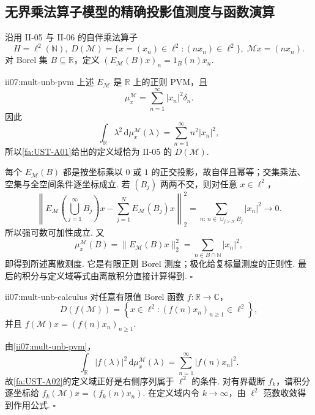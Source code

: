 \subsection{无界乘法算子模型的精确投影值测度与函数演算}

沿用 II-05 与 II-06 的自伴乘法算子
\[
H=\ell^2(\mathbb N),
\;
D(\mathcal M)=\{x=(x_n)\in\ell^2:(nx_n)\in\ell^2\},
\;
\mathcal Mx=(nx_n).
\]
对 Borel 集 \(\displaystyle B\subseteq\mathbb R\)，定义
\(\displaystyle (E_{\mathcal M}(B)x)_n=1_B(n)x_n.\)

\begin{FAProposition}[B][精确谱测度与谱定理定义域]{ii07:mult-unb-pvm}
上述 \(\displaystyle E_{\mathcal M}\) 是 \(\displaystyle\mathbb R\) 上的正则 PVM，且
\[
\mu_x^{\mathcal M}
=
\sum_{n=1}^{\infty}|x_n|^2\delta_n.
\]
因此
\[
\int_{\mathbb R}\lambda^2\,\mathrm{d}\mu_x^{\mathcal M}(\lambda)
=
\sum_{n=1}^{\infty}n^2|x_n|^2,
\]
所以\autoref{fa:UST-A01}给出的定义域恰为 II-05 的 \(\displaystyle D(\mathcal M)\).
\end{FAProposition}

\begin{FAProof}
每个 \(\displaystyle E_{\mathcal M}(B)\) 都是按坐标乘以 \(\displaystyle0\) 或 \(\displaystyle1\) 的正交投影，故自伴且幂等；交集乘法、空集与全空间条件逐坐标成立. 若 \(\displaystyle(B_j)\) 两两不交，则对任意 \(\displaystyle x\in\ell^2\)，
\[
\left\|
E_{\mathcal M}\left(\bigcup_{j=1}^{\infty}B_j\right)x
-
\sum_{j=1}^{N}E_{\mathcal M}(B_j)x
\right\|_2^2
=
\sum_{n:\,n\in\cup_{j>N}B_j}|x_n|^2
\to0.
\]
所以强可数可加性成立. 又
\[
\mu_x^{\mathcal M}(B)
=
\|E_{\mathcal M}(B)x\|_2^2
=
\sum_{n\in B\cap\mathbb N}|x_n|^2,
\]
即得到所述离散测度. 它是有限正则 Borel 测度；极化给复标量测度的正则性. 最后的积分与定义域等式由离散积分直接计算得到.
\hfill\(\square\)
\end{FAProof}

\begin{FAProposition}[B][可测函数演算]{ii07:mult-unb-calculus}
对任意有限值 Borel 函数 \(\displaystyle f:\mathbb R\to\mathbb C\)，
\[
D(f(\mathcal M))
=
\left\{
 x\in\ell^2:
 (f(n)x_n)_{n\geqslant1}\in\ell^2
\right\},
\]
并且
\(\displaystyle f(\mathcal M)x=(f(n)x_n)_{n\geqslant1}.\)
\end{FAProposition}

\begin{FAProof}
由\autoref{ii07:mult-unb-pvm}，
\[
\int_{\mathbb R}|f(\lambda)|^2\,\mathrm{d}\mu_x^{\mathcal M}(\lambda)
=
\sum_{n=1}^{\infty}|f(n)x_n|^2.
\]
故\autoref{fa:UST-A02}的定义域正好是右侧序列属于 \(\displaystyle\ell^2\) 的条件. 对有界截断 \(\displaystyle f_k\)，谱积分逐坐标给 \(\displaystyle f_k(\mathcal M)x=(f_k(n)x_n)\). 在定义域内令 \(\displaystyle k\to\infty\)，由 \(\displaystyle\ell^2\) 范数收敛得到作用公式.
\hfill\(\square\)
\end{FAProof}

